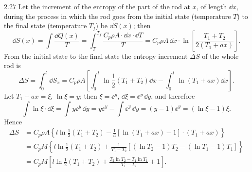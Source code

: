 \begin{solution}{2.27}
Let the increment of the entropy of the part of the rod at $x$, of length $\dd x$, during the
process in which the rod goes from the initial state (temperature $T$) to the final state
(temperature $T_f$) be $\dd S(x)$; then
\begin{equation*}
\dd S(x) = \int\frac{\dd Q(x)}{T}
= \int_T^{T_f}\frac{C_p\rho A\cdot\dd x\cdot\dd T}{T}
= C_p\rho A\,\dd x\cdot\ln\left[\frac{T_1+T_2}{2\left(T_1+ax\right)}\right].
\end{equation*}
From the initial state to the final state the entropy increment $\Delta S$ of the whole rod is
\begin{equation*}
\Delta S = \int_0^l\dd S_x
= C_p\rho A\left[\int_0^l\ln\frac{1}{2}\left(T_1+T_2\right)\dd x
-\int_0^l\ln\left(T_1+ax\right)\dd x\right].
\end{equation*}
Let $T_1+ax=\xi$, $\ln\xi=y$; then $\xi=\ee^y$, $\dd\xi=\ee^y\,\dd y$, and therefore
\begin{equation*}
\int\ln\xi\cdot\dd\xi = \int y\ee^y\,\dd y = y\ee^y-\int\ee^y\,\dd y
= (y-1)\ee^y = \left(\ln\xi-1\right)\xi .
\end{equation*}
Hence
\begin{align*}
\Delta S &= C_p\rho A\left\{l\ln\frac{1}{2}\left(T_1+T_2\right)
-\frac{1}{a}\left[\ln\left(T_1+ax\right)-1\right]\cdot\left(T_1+ax\right)\right\}\\
&= C_pM\left\{l\ln\frac{1}{2}\left(T_1+T_2\right)
+\frac{1}{T_1-T_2}\left[\left(\ln T_2-1\right)T_2-\left(\ln T_1-1\right)T_1\right]\right\}\\
&= C_pM\left[l\ln\frac{1}{2}\left(T_1+T_2\right)
+\frac{T_2\ln T_2-T_1\ln T_1}{T_1-T_2}+1\right].
\end{align*}
\end{solution}

